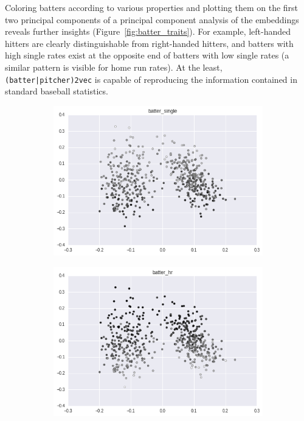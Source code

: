 \documentclass{article}
\begin{document}
Coloring batters according to various properties and plotting them on the first two principal components of a principal component analysis of the embeddings reveals further insights (Figure~\ref{fig:batter_traits}). For example, left-handed hitters are clearly distinguishable from right-handed hitters, and batters with high single rates exist at the opposite end of batters with low single rates (a similar pattern is visible for home run rates). At the least, \texttt{(batter|pitcher)2vec} is capable of reproducing the information contained in standard baseball statistics.

\begin{figure}
\captionsetup[subfigure]{labelformat=empty}
\centering
    \begin{subfigure}{0.5\linewidth}
    \centering
    \includegraphics[width=1\linewidth]{batter_single.png}
    \caption{}
    \end{subfigure}%
    \begin{subfigure}{0.5\linewidth}
    \centering
    \includegraphics[width=1\linewidth]{batter_hr.png}
    \caption{}
    \end{subfigure}\\[1ex]


\end{figure}
\end{document}
